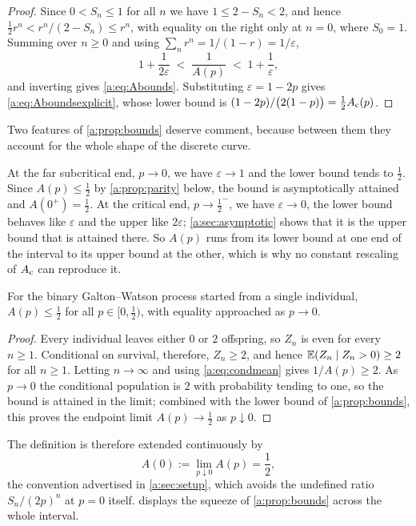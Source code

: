 \begin{proof}
Since $0<S_n\le1$ for all $n$ we have $1\le2-S_n<2$, and hence
$\tfrac12r^n < r^n/(2-S_n)\le r^n$, with equality on the right only at $n=0$, where
$S_0=1$. Summing over $n\ge0$ and using $\sum_nr^n = 1/(1-r) = 1/\varepsilon$,
\begin{equation*}
1+\frac{1}{2\varepsilon} \;<\; \frac{1}{A(p)} \;<\; 1+\frac{1}{\varepsilon},
\end{equation*}
and inverting gives \cref{a:eq:Abounds}. Substituting $\varepsilon=1-2p$ gives
\cref{a:eq:Aboundsexplicit}, whose lower bound is
$(1-2p)/\bigl(2(1-p)\bigr) = \tfrac12A_{\mathrm{c}}(p)$.
\end{proof}

Two features of \cref{a:prop:bounds} deserve comment, because between them they
account for the whole shape of the discrete curve.

At the far subcritical end, $p\to0$, we have $\varepsilon\to1$ and the lower bound
tends to $\tfrac12$. Since $A(p)\le\tfrac12$ by \cref{a:prop:parity} below, the bound
is asymptotically attained and $A(0^+)=\tfrac12$. At the critical end,
$p\to\tfrac12^-$, we have $\varepsilon\to0$, the lower bound behaves like
$\varepsilon$ and the upper like $2\varepsilon$; \cref{a:sec:asymptotic} shows that
it is the upper bound that is attained there. So $A(p)$ runs from its lower bound
at one end of the interval to its upper bound at the other, which is why no
constant rescaling of $A_{\mathrm{c}}$ can reproduce it.

\begin{proposition}
\label{a:prop:parity}
For the binary Galton--Watson process started from a single individual,
$A(p)\le\tfrac12$ for all $p\in[0,\tfrac12)$, with equality approached as $p\to0$.
\end{proposition}

\begin{proof}
Every individual leaves either $0$ or $2$ offspring, so $Z_n$ is even for every
$n\ge1$. Conditional on survival, therefore, $Z_n\ge2$, and hence
$\mathbb{E}\!\left(Z_n\mid Z_n>0\right)\ge2$ for all $n\ge1$. Letting $n\to\infty$ and using
\cref{a:eq:condmean} gives $1/A(p)\ge2$. As $p\to0$ the conditional population is
$2$ with probability tending to one, so the bound is attained in the limit;
combined with the lower bound of \cref{a:prop:bounds}, this proves the endpoint
limit $A(p)\to\tfrac12$ as $p\downarrow0$.
\end{proof}

\noindent
The definition is therefore extended continuously by
\begin{equation}
\label{a:eq:Aatzero}
A(0) := \lim_{p\downarrow0}A(p) = \frac12 ,
\end{equation}
the convention advertised in \cref{a:sec:setup}, which avoids the undefined ratio
$S_n/(2p)^n$ at $p=0$ itself.  displays the squeeze of
\cref{a:prop:bounds} across the whole interval.

